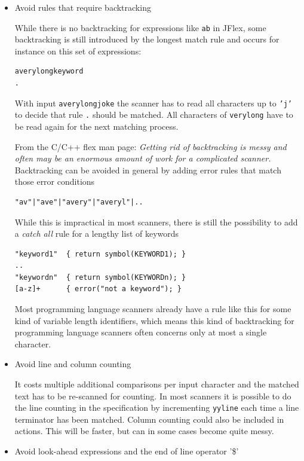 \begin{itemize}
\item
  Avoid rules that require backtracking

  While there is no backtracking for expressions like
  \texttt{a\textbar{}b} in JFlex, some backtracking is still introduced
  by the longest match rule and occurs for instance on this set of
  expressions:

\begin{verbatim}
averylongkeyword
.
\end{verbatim}

  With input \texttt{averylongjoke} the scanner has to read all
  characters up to \texttt{’j’} to decide that rule \texttt{.} should be
  matched. All characters of \texttt{verylong} have to be read again for
  the next matching process.

  From the C/C++ flex \autocite{flex} man page: \emph{Getting rid of
  backtracking is messy and often may be an enormous amount of work for
  a complicated scanner.} Backtracking can be avoided in general by
  adding error rules that match those error conditions

\begin{verbatim}
"av"|"ave"|"avery"|"averyl"|..
\end{verbatim}

  While this is impractical in most scanners, there is still the
  possibility to add a \emph{catch all} rule for a lengthy list of
  keywords

\begin{verbatim}
"keyword1"  { return symbol(KEYWORD1); } 
.. 
"keywordn"  { return symbol(KEYWORDn); }
[a-z]+      { error("not a keyword"); }
\end{verbatim}

  Most programming language scanners already have a rule like this for
  some kind of variable length identifiers, which means this kind of
  backtracking for programming language scanners often concerns only at
  most a single character.
\item
  Avoid line and column counting

  It costs multiple additional comparisons per input character and the
  matched text has to be re-scanned for counting. In most scanners it is
  possible to do the line counting in the specification by incrementing
  \texttt{yyline} each time a line terminator has been matched. Column
  counting could also be included in actions. This will be faster, but
  can in some cases become quite messy.
\item
  Avoid look-ahead expressions and the end of line operator '\$'


\end{itemize}
